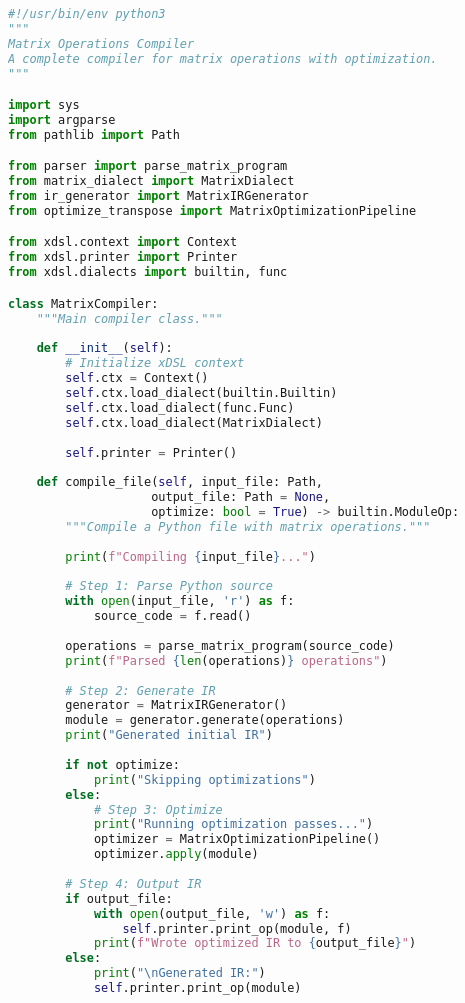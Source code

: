 \documentclass[11pt,a4paper]{article}
\begin{document}
\begin{lstlisting}[language=Python, caption=compiler.py - Main Compiler Driver]
#!/usr/bin/env python3
"""
Matrix Operations Compiler
A complete compiler for matrix operations with optimization.
"""

import sys
import argparse
from pathlib import Path

from parser import parse_matrix_program
from matrix_dialect import MatrixDialect
from ir_generator import MatrixIRGenerator
from optimize_transpose import MatrixOptimizationPipeline

from xdsl.context import Context
from xdsl.printer import Printer
from xdsl.dialects import builtin, func

class MatrixCompiler:
    """Main compiler class."""
    
    def __init__(self):
        # Initialize xDSL context
        self.ctx = Context()
        self.ctx.load_dialect(builtin.Builtin)
        self.ctx.load_dialect(func.Func)
        self.ctx.load_dialect(MatrixDialect)
        
        self.printer = Printer()
    
    def compile_file(self, input_file: Path, 
                    output_file: Path = None,
                    optimize: bool = True) -> builtin.ModuleOp:
        """Compile a Python file with matrix operations."""
        
        print(f"Compiling {input_file}...")
        
        # Step 1: Parse Python source
        with open(input_file, 'r') as f:
            source_code = f.read()
        
        operations = parse_matrix_program(source_code)
        print(f"Parsed {len(operations)} operations")
        
        # Step 2: Generate IR
        generator = MatrixIRGenerator()
        module = generator.generate(operations)
        print("Generated initial IR")
        
        if not optimize:
            print("Skipping optimizations")
        else:
            # Step 3: Optimize
            print("Running optimization passes...")
            optimizer = MatrixOptimizationPipeline()
            optimizer.apply(module)
        
        # Step 4: Output IR
        if output_file:
            with open(output_file, 'w') as f:
                self.printer.print_op(module, f)
            print(f"Wrote optimized IR to {output_file}")
        else:
            print("\nGenerated IR:")
            self.printer.print_op(module)
        

\end{lstlisting}
\end{document}
